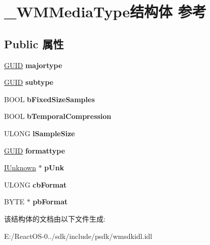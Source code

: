 \hypertarget{struct___w_m_media_type}{}\section{\+\_\+\+W\+M\+Media\+Type结构体 参考}
\label{struct___w_m_media_type}
\subsection*{Public 属性}
\begin{DoxyCompactItemize}
\item 
\mbox{\label{struct___w_m_media_type_a55303c2ba21cf7c52b0c481cb7541a2d}} 
\hyperlink{interface_g_u_i_d}{G\+U\+ID} {\bfseries majortype}
\item 
\mbox{\label{struct___w_m_media_type_a05d7397085f742465c950feac17a7d1a}} 
\hyperlink{interface_g_u_i_d}{G\+U\+ID} {\bfseries subtype}
\item 
\mbox{\label{struct___w_m_media_type_ad2f411b6a96c6ecc4a68a352f371a7b0}} 
B\+O\+OL {\bfseries b\+Fixed\+Size\+Samples}
\item 
\mbox{\label{struct___w_m_media_type_a6a0d1ec81cf785d29447065ab778af86}} 
B\+O\+OL {\bfseries b\+Temporal\+Compression}
\item 
\mbox{\label{struct___w_m_media_type_ae72ca0c15581090c227ecf1591e300d9}} 
U\+L\+O\+NG {\bfseries l\+Sample\+Size}
\item 
\mbox{\label{struct___w_m_media_type_a084110d40667e5a5850239100933b456}} 
\hyperlink{interface_g_u_i_d}{G\+U\+ID} {\bfseries formattype}
\item 
\mbox{\label{struct___w_m_media_type_afd4285a138a4a24888c6c0d3ee0c6299}} 
\hyperlink{interface_i_unknown}{I\+Unknown} $\ast$ {\bfseries p\+Unk}
\item 
\mbox{\label{struct___w_m_media_type_a45dc451e2d9cf5bad4b97bbfdb59acd3}} 
U\+L\+O\+NG {\bfseries cb\+Format}
\item 
\mbox{\label{struct___w_m_media_type_adf219a89604c109b71df7505244331ef}} 
B\+Y\+TE $\ast$ {\bfseries pb\+Format}
\end{DoxyCompactItemize}


该结构体的文档由以下文件生成\+:\begin{DoxyCompactItemize}
\item 
E\+:/\+React\+O\+S-\/0../sdk/include/psdk/wmsdkidl.\+idl\end{DoxyCompactItemize}
